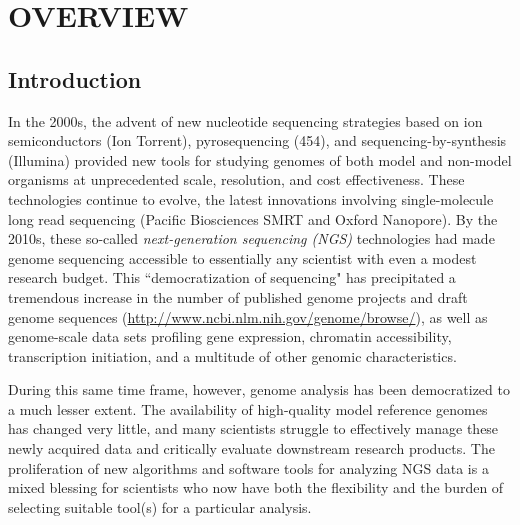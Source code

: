\chapter{OVERVIEW}

\section{Introduction}

In the 2000s, the advent of new nucleotide sequencing strategies based on ion semiconductors (Ion Torrent), pyrosequencing (454), and sequencing-by-synthesis (Illumina) provided new tools for studying genomes of both model and non-model organisms at unprecedented scale, resolution, and cost effectiveness.
These technologies continue to evolve, the latest innovations involving single-molecule long read sequencing (Pacific Biosciences SMRT and Oxford Nanopore).
By the 2010s, these so-called \textit{next-generation sequencing (NGS)} technologies had made genome sequencing accessible to essentially any scientist with even a modest research budget.
This ``democratization of sequencing" has precipitated a tremendous increase in the number of published genome projects and draft genome sequences (\url{http://www.ncbi.nlm.nih.gov/genome/browse/}), as well as genome-scale data sets profiling gene expression, chromatin accessibility, transcription initiation, and a multitude of other genomic characteristics.

During this same time frame, however, genome analysis has been democratized to a much lesser extent.
The availability of high-quality model reference genomes has changed very little, and many scientists struggle to effectively manage these newly acquired data and critically evaluate downstream research products.
The proliferation of new algorithms and software tools for analyzing NGS data is a mixed blessing for scientists who now have both the flexibility and the burden of selecting suitable tool(s) for a particular analysis.


